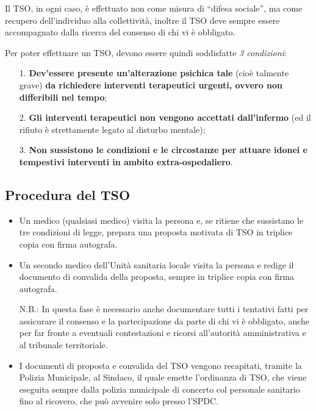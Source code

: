 Il TSO, in ogni caso, è effettuato non come misura di ``difesa
sociale'', ma come recupero dell'individuo alla collettività, inoltre il
TSO deve sempre essere accompagnato dalla ricerca del consenso di chi vi
è obbligato.

Per poter effettuare un TSO, devono essere quindi soddisfatte \emph{3
condizioni}:

\begin{itemize}
\item[1.]
  \textbf{Dev'essere presente un'alterazione psichica tale} (cioè
  talmente grave) \textbf{da richiedere interventi terapeutici urgenti,
  ovvero non differibili nel tempo};
\item[2.]
  \textbf{Gli interventi terapeutici non vengono accettati dall'infermo}
  (ed il rifiuto è strettamente legato al disturbo mentale);
\item[3.]
  \textbf{Non sussistono le condizioni e le circostanze per attuare
  idonei e tempestivi interventi in ambito extra-ospedaliero}.
\end{itemize}

\subsection{Procedura del TSO}

\begin{itemize}
\item
  Un medico (qualsiasi medico) visita la persona e, se ritiene che
  sussistano le tre condizioni di legge, prepara una proposta motivata
  di TSO in triplice copia con firma autografa.
\item
  Un secondo medico dell'Unità sanitaria locale visita la persona e
  redige il documento di convalida della proposta, sempre in triplice
  copia con firma autografa.
  
N.B.: In questa fase è necessario anche documentare tutti i tentativi
fatti per assicurare il consenso e la partecipazione da parte di chi vi
è obbligato, anche per far fronte a eventuali contestazioni e ricorsi
all'autorità amministrativa e al tribunale territoriale.

\item
  I documenti di proposta e convalida del TSO vengono recapitati,
  tramite la Polizia Municipale, al Sindaco, il quale emette l'ordinanza
  di TSO, che viene eseguita sempre dalla polizia municipale di concerto
  col personale sanitario fino al ricovero, che può avvenire solo presso
  l'SPDC.
\end{itemize}

